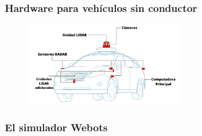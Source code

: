 \begin{frame}\frametitle{Hardware para vehículos sin conductor}
  \begin{figure}
    \centering
    \includegraphics[width=0.6\textwidth]{Figuras/Hardware.png}
  \end{figure}
\end{frame}

\begin{frame}\frametitle{El simulador Webots}
  
\end{frame}